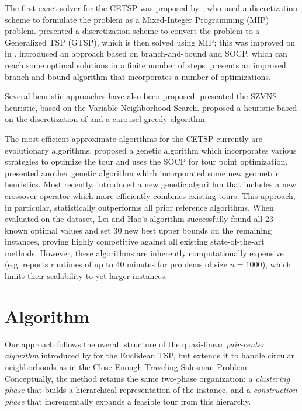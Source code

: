 \documentclass[11pt]{article}
\begin{document}
The first exact solver for the CETSP was proposed by \textcite{Behdani2014}, who used a discretization scheme to formulate the problem as a Mixed-Integer Programming (MIP) problem. \textcite{Carrabs2017a} presented a discretization scheme to convert the problem to a Generalized TSP (GTSP), which is then solved using MIP; this was improved on in \textcite{Carrabs2017b}. \textcite{Coutinho2016} introduced an approach based on branch-and-bound and SOCP, which can reach some optimal solutions in a finite number of steps. \textcite{Zhang2023} presents an improved branch-and-bound algorithm that incorporates a number of optimizations.

Several heuristic approaches have also been proposed. \textcite{Wang2019} presented the SZVNS heuristic, based on the Variable Neighborhood Search. \textcite{Carrabs2020} proposed a heuristic based on the discretization of \textcite{Carrabs2017b} and a carousel greedy algorithm.

The most efficient approximate algorithms for the CETSP currently are evolutionary algorithms. \textcite{DiPlacido2022} proposed a genetic algorithm which incorporates various strategies to optimize the tour and uses the SOCP for tour point optimization. \textcite{Cariou2023} presented another genetic algorithm which incorporated some new geometric heuristics. Most recently, \textcite{LeiHao2024} introduced a new genetic algorithm that includes a new crossover operator which more efficiently combines existing tours. This approach, in particular, statistically outperforms all prior reference algorithms. When evaluated on the \textcite{Mennell2009} dataset, Lei and Hao's algorithm successfully found all 23 known optimal values and set 30 new best upper bounds on the remaining instances, proving highly competitive against all existing state-of-the-art methods. However, these algorithms are inherently computationally expensive (e.g. \textcite{LeiHao2024} reports runtimes of up to 40 minutes for problems of size $n = 1000$), which limits their scalability to yet larger instances.

\section{Algorithm}

Our approach follows the overall structure of the quasi-linear \emph{pair-center algorithm} introduced by \textcite{Formella2024} for the Euclidean TSP, but extends it to handle circular neighborhoods as in the Close-Enough Traveling Salesman Problem. Conceptually, the method retains the same two-phase organization: a \emph{clustering phase} that builds a hierarchical representation of the instance, and a \emph{construction phase} that incrementally expands a feasible tour from this hierarchy.
\end{document}
